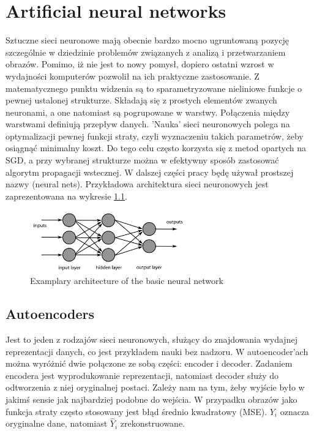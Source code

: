 \chapter{Artificial neural networks}



Sztuczne sieci neuronowe mają obecnie bardzo mocno ugruntowaną pozycję szczególnie w dziedzinie problemów związanych z analizą i przetwarzaniem obrazów. Pomimo, iż nie jest to nowy pomysł, dopiero ostatni wzrost w wydajności komputerów pozwolił na ich praktyczne zastosowanie. Z matematycznego punktu widzenia są to sparametryzowane nieliniowe funkcje o pewnej ustalonej strukturze. Składają się z prostych elementów zwanych neuronami, a one natomiast są pogrupowane w warstwy. Połączenia między warstwami definiują przepływ danych. 'Nauka' sieci neuronowych polega na optymalizacji pewnej funkcji straty, czyli wyznaczeniu takich parametrów, żeby osiągnąć minimalny koszt. Do tego celu często korzysta się z metod opartych na SGD, a przy wybranej strukturze można w efektywny sposób zastosować algorytm propagacji wstecznej. W dalszej części pracy będę używał prostszej nazwy (neural nets). Przykładowa architektura sieci neuronowych jest zaprezentowana na wykresie \ref{fig:neural_nets}.

\begin{figure}[h!]
    \centering
    \includegraphics[width=0.6\textwidth]{images/neural_nets}
    \caption{Examplary architecture of the basic neural network}
    \label{fig:neural_nets}
\end{figure}

\section{Autoencoders}

Jest to jeden z rodzajów sieci neuronowych, służący do znajdowania wydajnej reprezentacji danych, co jest przykładem nauki bez nadzoru. W autoencoder'ach można wyróżnić dwie połączone ze sobą części: encoder i decoder. Zadaniem encodera jest wyprodukowanie reprezentacji, natomiast decoder służy do odtworzenia z niej oryginalnej postaci. Zależy nam na tym, żeby wyjście było w jakimś sensie jak najbardziej podobne do wejścia. W przypadku obrazów jako funkcja straty często stosowany jest błąd średnio kwadratowy (MSE). $Y _ { i }$ oznacza oryginalne dane, natomiast $\hat { Y } _ { i }$ zrekonstruowane.

